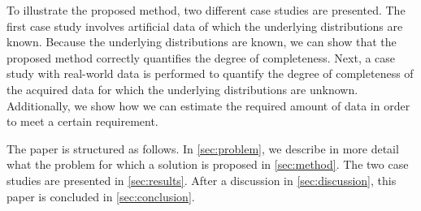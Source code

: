 To illustrate the proposed method, two different case studies are presented. The first case study involves artificial data of which the underlying distributions are known. Because the underlying distributions are known, we can show that the proposed method correctly quantifies the degree of completeness. Next, a case study with real-world data is performed to quantify the degree of completeness of the acquired data for which the underlying distributions are unknown. Additionally, we show how we can estimate the required amount of data in order to meet a certain requirement.

The paper is structured as follows. %
In \cref{sec:problem}, we describe in more detail what the problem for which a solution is proposed in \cref{sec:method}. The two case studies are presented in \cref{sec:results}. After a discussion in \cref{sec:discussion}, this paper is concluded in \cref{sec:conclusion}.
